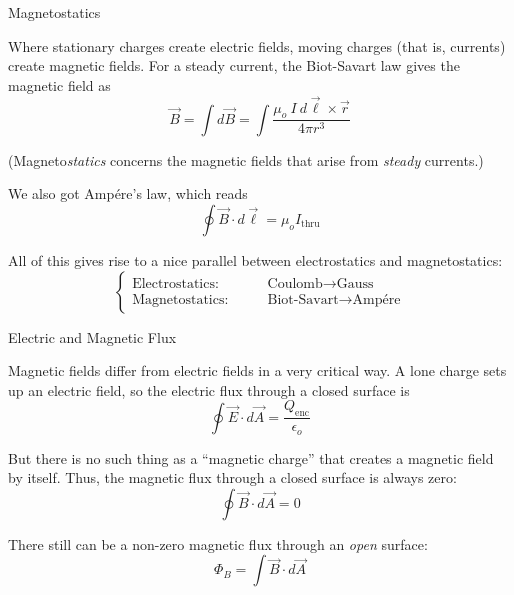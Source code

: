 \documentclass{beamer}
\begin{document}
\begin{frame}{Magnetostatics}

Where stationary charges create electric fields, moving charges (that is, currents) create magnetic fields. For a steady current, the Biot-Savart law gives the magnetic field as
\begin{equation*}
    \vec{B} = \int d\vec{B} = \int \frac{\mu_o\ I\ d\vec{\ell} \times \vec{r}}{4\pi r^3}
\end{equation*}

\begin{center}
    (Magneto{\emph{statics}} concerns the magnetic fields that arise from \emph{steady} currents.)
\end{center}

\vfill
We also got Amp{\'e}re's law, which reads
\begin{equation*}
    \boxed{\oint \vec{B} \cdot d\vec{\ell} = \mu_o I_{\text{thru}}}
\end{equation*}

All of this gives rise to a nice parallel between electrostatics and magnetostatics:
\begin{equation*}
    \begin{cases} \text{Electrostatics:}& \qquad \text{Coulomb} \to \text{Gauss} \\ \text{Magnetostatics:}& \qquad \text{Biot-Savart} \to \text{Amp{\'e}re} \end{cases}
\end{equation*}

\end{frame}

\begin{frame}{Electric and Magnetic Flux}

Magnetic fields differ from electric fields in a very critical way. A lone charge sets up an electric field, so the electric flux through a closed surface is
\begin{equation*}
    \oint \vec{E} \cdot d\vec{A} = \frac{Q_{\text{enc}}}{\epsilon_o}
\end{equation*}

But there is no such thing as a ``magnetic charge'' that creates a magnetic field by itself. Thus, the magnetic flux through a closed surface is always zero:
\begin{equation*}
    \boxed{\oint \vec{B} \cdot d\vec{A} = 0}
\end{equation*}

There still can be a non-zero magnetic flux through an \emph{open} surface:
\begin{equation*}
    \Phi_B = \int \vec{B} \cdot d\vec{A}
\end{equation*}

\end{frame}
\end{document}
